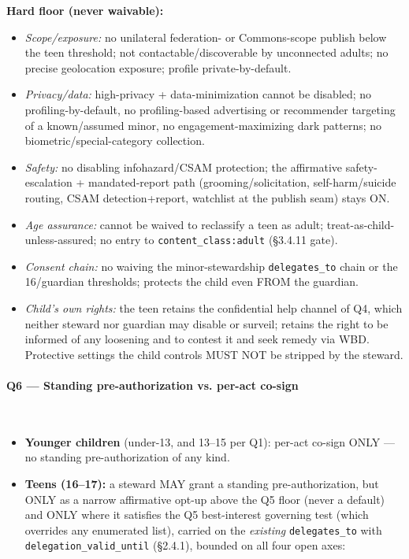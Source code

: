 \documentclass[11pt]{article}
\begin{document}
\textbf{Hard floor (never waivable):}

\begin{itemize}\setlength\itemsep{0pt}
\item \textit{Scope/exposure:} no unilateral federation- or Commons-scope publish below the teen threshold; not contactable/discoverable by unconnected adults; no precise geolocation exposure; profile private-by-default.
\item \textit{Privacy/data:} high-privacy + data-minimization cannot be disabled; no profiling-by-default, no profiling-based advertising or recommender targeting of a known/assumed minor, no engagement-maximizing dark patterns; no biometric/special-category collection.
\item \textit{Safety:} no disabling infohazard/CSAM protection; the affirmative safety-escalation + mandated-report path (grooming/solicitation, self-harm/suicide routing, CSAM detection+report, watchlist at the publish seam) stays ON.
\item \textit{Age assurance:} cannot be waived to reclassify a teen as adult; treat-as-child-unless-assured; no entry to \texttt{content\_class:adult} (§3.4.11 gate).
\item \textit{Consent chain:} no waiving the minor-stewardship \texttt{delegates\_to} chain or the 16/guardian thresholds; protects the child even FROM the guardian.
\item \textit{Child's own rights:} the teen retains the confidential help channel of Q4, which neither steward nor guardian may disable or surveil; retains the right to be informed of any loosening and to contest it and seek remedy via WBD. Protective settings the child controls MUST NOT be stripped by the steward.
\end{itemize}


\paragraph{Q6 — Standing pre-authorization vs. per-act co-sign}\mbox{}\\


\begin{itemize}\setlength\itemsep{0pt}
\item \textbf{Younger children} (under-13, and 13–15 per Q1): per-act co-sign ONLY — no standing pre-authorization of any kind.
\item \textbf{Teens (16–17):} a steward MAY grant a standing pre-authorization, but ONLY as a narrow affirmative opt-up above the Q5 floor (never a default) and ONLY where it satisfies the Q5 best-interest governing test (which overrides any enumerated list), carried on the \textit{existing} \texttt{delegates\_to} with \texttt{delegation\_valid\_until} (§2.4.1), bounded on all four open axes:
\end{itemize}
\end{document}
